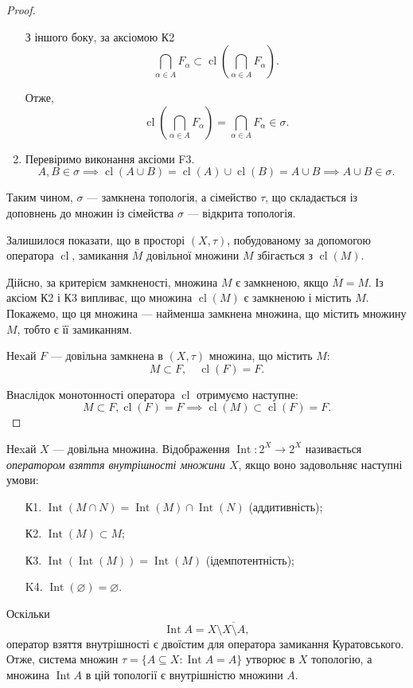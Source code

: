 \documentclass[a4paper, 12pt]{article}
\renewcommand{\emptyset}{\varnothing}
\DeclareMathOperator{\cl}{cl}
\DeclareMathOperator{\Int}{Int}
\begin{document}
\begin{proof}
\begin{enumerate}
		З іншого боку, за аксіомою К2 \[ \bigcap_{\alpha \in A} F_\alpha \subset \cl \left(\bigcap_{\alpha \in A} F_\alpha \right). \]

		Отже, \[ \cl \left(\bigcap_{\alpha \in A} F_\alpha \right) = \bigcap_{\alpha \in A} F_\alpha \in \sigma. \]

		\item Перевіримо виконання аксіоми F3. \[A, B \in \sigma \implies \cl(A\cup B) = \cl(A)\cup \cl(B) = A\cup B \implies A\cup B\in\sigma.\]
	\end{enumerate}

	Таким чином, $\sigma$ --- замкнена топологія, а сімейство $\tau$, що
	складається із доповнень до множин із сімейства $\sigma$ ---
	відкрита топологія. \smallskip

	Залишилося показати, що в просторі $(X, \tau)$, побудованому
	за допомогою оператора $\cl$, замикання $\overline{M}$ довільної
	множини $M$ збігається з $\cl(M)$. \smallskip

	Дійсно, за критерієм замкненості, множина $M$ є замкненою, якщо
	$\overline{M} = M$. Із аксіом К2 і К3 випливає, що множина $\cl(M)$ є
	замкненою і містить $M$. Покажемо, що ця множина ---
	найменша замкнена множина, що містить множину $M$, 
	тобто є її замиканням. \smallskip

	Неxай $F$ --- довільна замкнена в $(X, \tau)$ множина, що
	містить $M$: \[ M \subset F, \quad \cl(F) = F. \]

	Внаслідок монотонності оператора $\cl$ отримуємо
	наступне: \[ M \subset F, \cl(F) = F \implies \cl(M) \subset \cl(F) = F.\]
\end{proof}

\begin{definition}
	Неxай $X$ --- довільна множина. Відображення $\Int: 2^X \to 2^X$ називається \textit{оператором взяття 
	внутрішності множини $X$}, якщо воно задовольняє
	наступні умови:
	\begin{enumerate}
		\item[К1.] $\Int(M \cap N) = \Int(M)\cap \Int(N)$ (аддитивність);
		\item[К2.] $\Int(M) \subset M$;
		\item[К3.] $\Int(\Int(M)) = \Int(M)$ (ідемпотентність);
		\item[K4.] $\Int(\emptyset) = \emptyset$.
	\end{enumerate}
\end{definition}

\begin{corollary}
	Оскільки \[\Int A = X \setminus \overline{X \setminus A}, \]
	оператор взяття внутрішності є двоїстим для оператора
	замикання Куратовського. Отже, система множин
	$\tau = \{A \subseteq X: \Int A = A\}$ утворює в $X$ топологію, а множина
	$\Int A$ в цій топології є внутрішністю множини $A$.
\end{corollary}
\end{document}
